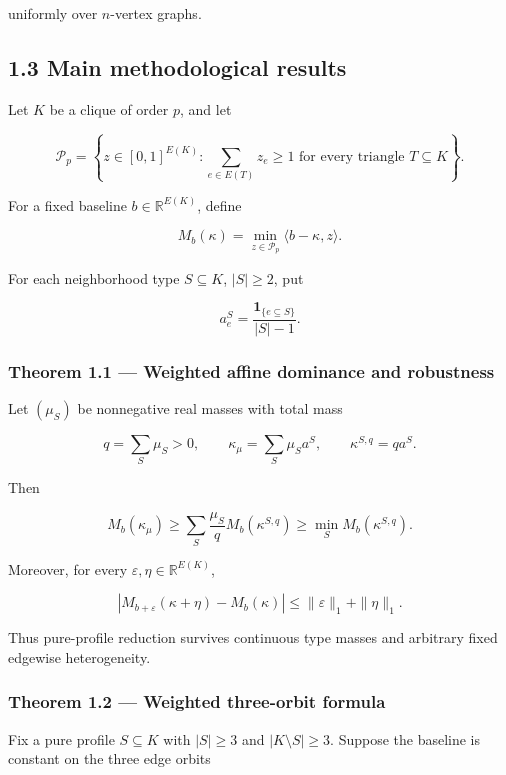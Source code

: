 \documentclass[11pt,a4paper]{article}
\begin{document}
uniformly over \(n\)-vertex graphs.

\subsection{1.3 Main methodological results}\label{main-methodological-results}

Let \(K\) be a clique of order \(p\), and let

\[
\mathcal P_p=
\left\{
z\in[0,1]^{E(K)}:
\sum_{e\in E(T)}z_e\ge1
\text{ for every triangle }T\subseteq K
\right\}.
\]

For a fixed baseline \(b\in\mathbb R^{E(K)}\), define

\[
M_b(\kappa)=\min_{z\in\mathcal P_p}\langle b-\kappa,z\rangle.
\]

For each neighborhood type \(S\subseteq K\), \(|S|\ge2\), put

\[
a^S_e=\frac{\mathbf 1_{\{e\subseteq S\}}}{|S|-1}.
\]

\subsubsection{Theorem 1.1 --- Weighted affine dominance and robustness}\label{theorem-1.1-weighted-affine-dominance-and-robustness}

Let \((\mu_S)\) be nonnegative real masses with total mass

\[
q=\sum_S\mu_S>0,
\qquad
\kappa_\mu=\sum_S\mu_Sa^S,
\qquad
\kappa^{S,q}=qa^S.
\]

Then

\[
\boxed{
M_b(\kappa_\mu)
\ge
\sum_S\frac{\mu_S}{q}M_b(\kappa^{S,q})
\ge
\min_SM_b(\kappa^{S,q}).
}
\tag{1.3}
\]

Moreover, for every \(\varepsilon,\eta\in\mathbb R^{E(K)}\),

\[
\boxed{
\left|
M_{b+\varepsilon}(\kappa+\eta)-M_b(\kappa)
\right|
\le
\|\varepsilon\|_1+\|\eta\|_1.
}
\tag{1.4}
\]

Thus pure-profile reduction survives continuous type masses and arbitrary fixed edgewise heterogeneity.

\subsubsection{Theorem 1.2 --- Weighted three-orbit formula}\label{theorem-1.2-weighted-three-orbit-formula}

Fix a pure profile \(S\subseteq K\) with \(|S|\ge3\) and \(|K\setminus S|\ge3\). Suppose the baseline is constant on the three edge orbits
\end{document}
